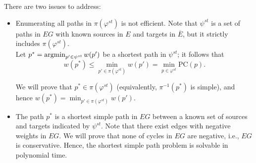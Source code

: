 There are two issues to address:
\begin{itemize}
\item Enumerating all paths in  \(\pi(\varphi^{st})\) is not efficient. Note that \(\psi^{st} \) is a set of paths in \(EG\) with known sources in \(E\) and targets in  \(\overline{E}\), but it strictly includes   \(\pi(\varphi^{st})\). \\
Let \(p^{\ast}  = \operatorname{argmin}_{p' \in \psi^{st} } w(p')\) be a shortest path in \(\psi^{st}\); it follows that
\begin{equation}
\label{boundw}
   w(p^{\ast} ) \le \min_{p' \in \pi(\varphi^{st})} w(p')  =  \min_{p \in \varphi^{st}} \textrm{PC}(p).
\end{equation}

We will prove that \(p^{\ast}  \in \pi(\varphi^{st})\) (equivalently, \(\pi^{-1}(p^{\ast})\)  is simple), and hence \(w(p^{\ast}) = \min_{p' \in \pi(\varphi^{st})} w(p') \).
\item The path \(p^{\ast}\) is a shortest simple path in \(EG\) between a known set of sources and targets indicated by \(\psi^{st}\). Note that there exist edges with negative weights in \(EG\). We will prove that none of cycles in \(EG\) are negative, i.e.,  $EG$ is conservative. Hence, the shortest simple path problem is solvable in polynomial time.
\end{itemize}

